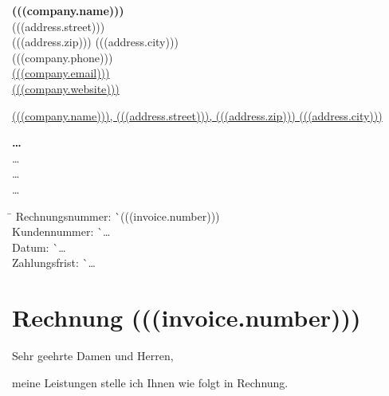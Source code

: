 \documentclass[a4paper, article, oneside, hidelinks, 10pt]{memoir}
\begin{document}
\begin{raggedleft}
	\small
	\textbf{(((company.name)))} \\
	(((address.street))) \\
	(((address.zip))) (((address.city))) \\
	(((company.phone))) \\
	\href{mailto:(((company.email)))}{(((company.email)))} \\
	\href{https://(((company.website)))}{(((company.website)))} \\
\end{raggedleft}

\vspace{1cm}

\begin{minipage}[t]{0.6\textwidth}
	{\scriptsize \underline{(((company.name))), (((address.street))), (((address.zip))) (((address.city)))}}

	\medskip

	{\large \textbf{\dots}} \\
	\dots \\
	\dots \\
	\dots
\end{minipage}
\begin{minipage}[t]{0.4\textwidth}
	\small
	\begin{tabbing}
		\hspace{0.2\textwidth} \= \hspace{0.2\textwidth} \kill
		Rechnungsnummer: \` \hfill (((invoice.number))) \\
		Kundennummer: \` \hfill \dots \\
		Datum: \` \hfill \dots \\
		Zahlungsfrist: \` \hfill \dots \\
	\end{tabbing}
\end{minipage}

\vspace{2cm}

\chapter*{Rechnung (((invoice.number)))}

Sehr geehrte Damen und Herren,

\medskip

meine Leistungen stelle ich Ihnen wie folgt in Rechnung.
\end{document}
